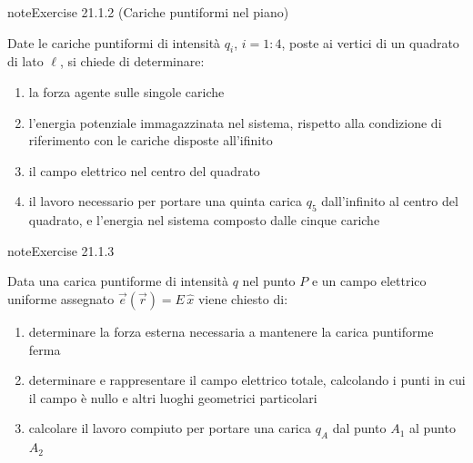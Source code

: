 \documentclass[letterpaper,10pt,italian]{jupyterBook}
\begin{document}
\begin{sphinxadmonition}{note}{Exercise 21.1.2 (Cariche puntiformi nel piano)}



\sphinxAtStartPar
Date le cariche puntiformi di intensità \(q_i\), \(i=1:4\), poste ai vertici di un quadrato di lato \(\ell\), si chiede di determinare:
\begin{enumerate}
%
\item {} 
\sphinxAtStartPar
la forza agente sulle singole cariche

\item {} 
\sphinxAtStartPar
l’energia potenziale immagazzinata nel sistema, rispetto alla condizione di riferimento con le cariche disposte all’ifinito

\item {} 
\sphinxAtStartPar
il campo elettrico nel centro del quadrato

\item {} 
\sphinxAtStartPar
il lavoro necessario per portare una quinta carica \(q_5\) dall’infinito al centro del quadrato, e l’energia nel sistema composto dalle cinque cariche

\end{enumerate}
\end{sphinxadmonition}
 \label{exercise:ch/electromagnetism/electrostatics-problems-exercise-2}

\begin{sphinxadmonition}{note}{Exercise 21.1.3}



\sphinxAtStartPar
Data una carica puntiforme di intensità \(q\) nel punto \(P\) e un campo elettrico uniforme assegnato \(\vec{e}(\vec{r}) = E \, \hat{x}\) viene chiesto di:
\begin{enumerate}
%
\item {} 
\sphinxAtStartPar
determinare la forza esterna necessaria a mantenere la carica puntiforme ferma

\item {} 
\sphinxAtStartPar
determinare e rappresentare il campo elettrico totale, calcolando i punti in cui il campo è nullo e altri luoghi geometrici particolari

\item {} 
\sphinxAtStartPar
calcolare il lavoro compiuto per portare una carica \(q_A\) dal punto \(A_1\) al punto \(A_2\)

\end{enumerate}
\end{sphinxadmonition}
 \label{exercise:ch/electromagnetism/electrostatics-problems-exercise-3}
\end{document}
